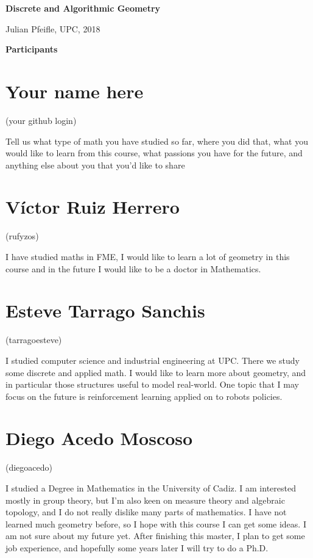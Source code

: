 \documentclass[11pt]{amsart}
\begin{document}
\begin{center}
\textbf{\sffamily
   Discrete and Algorithmic Geometry }

\medskip
   Julian Pfeifle,
   UPC, 2018
\end{center}

\bigskip

\begin{center}
  \textbf{\sffamily Participants}
\end{center}

\medskip

\section*{Your name here}
(your github login)

Tell us what type of math you have studied so far, where you did that, what you would like to learn from this course, what passions you have for the future, and anything else about you that you'd like to share

\medskip

\section*{Víctor Ruiz Herrero}
(rufyzos)

I  have  studied  maths  in  FME,  I  would  like  to  learn  a  lot  of  geometry  in  this course and in the future I would like to be a doctor in Mathematics.

\medskip

\section*{Esteve Tarrago Sanchis}
(tarragoesteve)

I  studied computer science and industrial engineering at UPC. There we study some discrete and applied math. I would like to learn more about geometry, and in particular those structures useful to model real-world. One topic that I may focus on the future is reinforcement learning applied on to robots policies. 

\section*{Diego Acedo Moscoso}
(diegoacedo)

I studied a Degree in Mathematics in the University of Cadiz. I am interested mostly in group theory, but I'm also keen on measure theory and algebraic topology, and I do not really dislike many parts of mathematics. I have not learned much geometry before, so I hope with this course I can get some ideas.
I am not sure about my future yet. After finishing this master, I plan to get some job experience, and hopefully some years later I will try to do a Ph.D.
\end{document}
